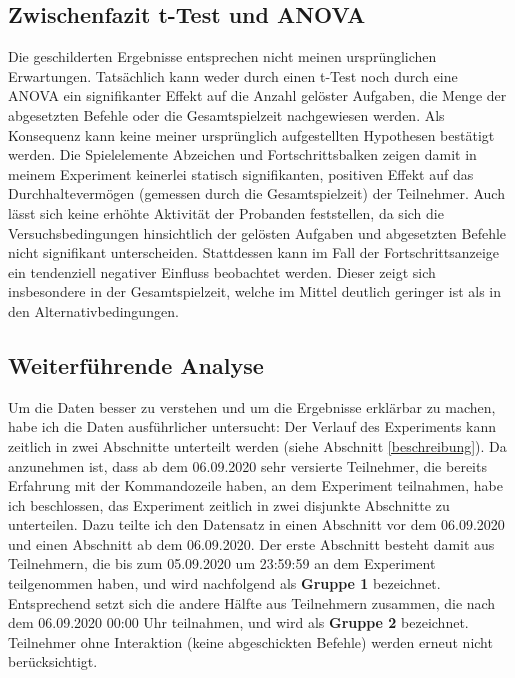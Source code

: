 
\subsection{Zwischenfazit t-Test und ANOVA}
Die geschilderten Ergebnisse entsprechen nicht meinen ursprünglichen Erwartungen. Tatsächlich kann weder durch einen t-Test noch durch eine ANOVA ein signifikanter Effekt auf die Anzahl gelöster Aufgaben, die Menge der abgesetzten Befehle oder die Gesamtspielzeit nachgewiesen werden. Als Konsequenz kann keine meiner ursprünglich aufgestellten Hypothesen bestätigt werden. Die Spielelemente Abzeichen und Fortschrittsbalken zeigen damit in meinem Experiment keinerlei statisch signifikanten, positiven Effekt auf das Durchhaltevermögen (gemessen durch die Gesamtspielzeit) der Teilnehmer. Auch lässt sich keine erhöhte Aktivität der Probanden feststellen, da sich die Versuchsbedingungen hinsichtlich der gelösten Aufgaben und abgesetzten Befehle nicht signifikant unterscheiden. Stattdessen kann im Fall der Fortschrittsanzeige ein tendenziell negativer Einfluss beobachtet werden. Dieser zeigt sich insbesondere in der Gesamtspielzeit, welche im Mittel deutlich geringer ist als in den Alternativbedingungen. 

\subsection{Weiterführende Analyse}
Um die Daten besser zu verstehen und um die Ergebnisse erklärbar zu machen, habe ich die Daten ausführlicher untersucht: Der Verlauf des Experiments kann zeitlich in zwei Abschnitte unterteilt werden (siehe Abschnitt \ref{beschreibung}). Da anzunehmen ist, dass ab dem 06.09.2020 sehr versierte Teilnehmer, die bereits Erfahrung mit der Kommandozeile haben, an dem Experiment teilnahmen, habe ich beschlossen, das Experiment zeitlich in zwei disjunkte Abschnitte zu unterteilen. Dazu teilte ich den Datensatz in einen Abschnitt vor dem 06.09.2020 und einen Abschnitt ab dem 06.09.2020. Der erste Abschnitt besteht damit aus Teilnehmern, die bis zum 05.09.2020 um 23:59:59 an dem Experiment teilgenommen haben, und wird nachfolgend als \textbf{Gruppe 1} bezeichnet. Entsprechend setzt sich die andere Hälfte aus Teilnehmern zusammen, die nach dem 06.09.2020 00:00 Uhr teilnahmen, und wird als \textbf{Gruppe 2} bezeichnet. Teilnehmer ohne Interaktion (keine abgeschickten Befehle) werden erneut nicht berücksichtigt.

